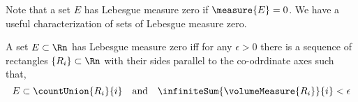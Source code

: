 Note that a set $E$ has Lebesgue measure zero if $\measure{E} = 0$. 
We have a useful characterization of sets of Lebesgue measure zero.
\begin{Proposition}[name=Lebesgue measure $0$]\label{prop:lebesgue_meas_0}
    A set $E \subset \Rn$ has Lebesgue measure zero iff for any $\epsilon > 0$ there is a sequence of
    rectangles $\lbrace R_i \rbrace \subset \Rn$ with their sides parallel to the co-odrdinate axes
    such that,
    \[E \subset \countUnion{R_i}{i}\quad\text{and}\quad \infiniteSum{\volumeMeasure{R_i}}{i} <
	\epsilon\]
\end{Proposition}

